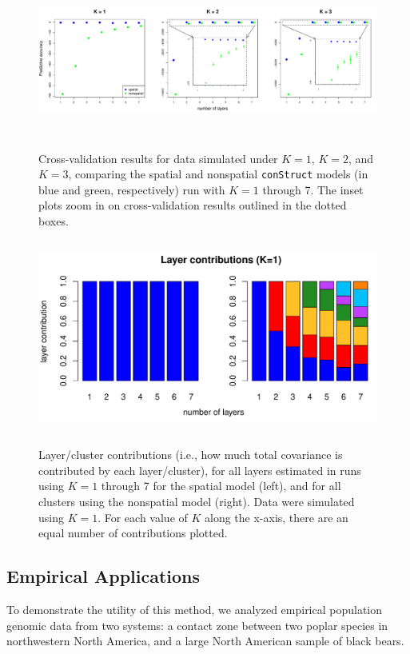 \documentclass[12pt]{article}
\begin{document}
\begin{figure}
	\centering
		{\includegraphics[width=6in,height=2in]{figs/sims/sim_xvals.pdf}}
	\caption{
	Cross-validation results for data simulated under $K=1$, $K=2$, and $K=3$, 
	comparing the spatial and nonspatial \texttt{conStruct} models 
	(in blue and green, respectively) run with $K=1$ through 7.  
	The inset plots zoom in on cross-validation results outlined in the dotted boxes.
    }\label{sim_xvals}
\end{figure}

\begin{figure}
	\centering
		{\includegraphics[width=5in,height=2.5in]{figs/sims/simK1_laycon_barplots.pdf}}
		\caption{
			Layer/cluster contributions (i.e., how much total covariance is contributed by each layer/cluster), 
			for all layers estimated in runs using $K = 1$ through 7 
			for the spatial model (left),
			and for all clusters using the nonspatial model (right).
			Data were simulated using $K=1$.
			For each value of $K$ along the x-axis, there are an equal number of contributions plotted.
		}\label{simK1_laycon}
\end{figure}


\subsection*{Empirical Applications}

To demonstrate the utility of this method, we analyzed empirical population genomic data from two systems:
a contact zone between two poplar species in northwestern North America,
and a large North American sample of black bears.
\end{document}

